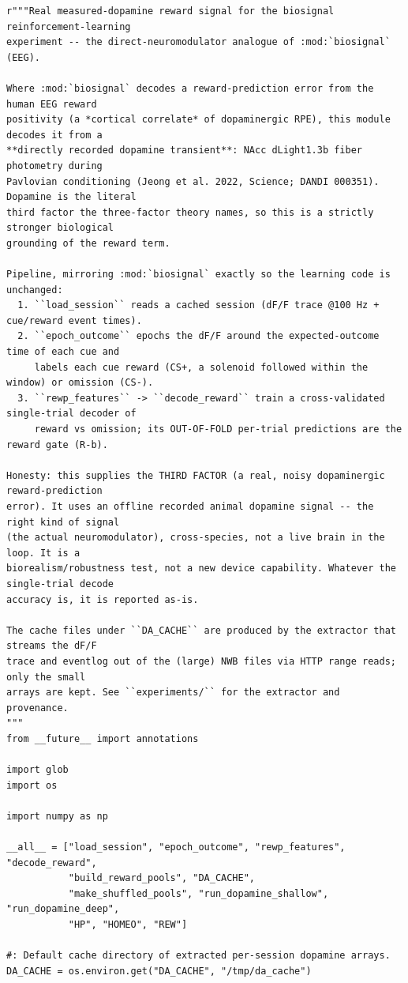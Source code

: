 \begin{lstlisting}[caption={mrl\_trace/dopamine.py},label={lst:siox-src-dopamine}]
r"""Real measured-dopamine reward signal for the biosignal reinforcement-learning
experiment -- the direct-neuromodulator analogue of :mod:`biosignal` (EEG).

Where :mod:`biosignal` decodes a reward-prediction error from the human EEG reward
positivity (a *cortical correlate* of dopaminergic RPE), this module decodes it from a
**directly recorded dopamine transient**: NAcc dLight1.3b fiber photometry during
Pavlovian conditioning (Jeong et al. 2022, Science; DANDI 000351). Dopamine is the literal
third factor the three-factor theory names, so this is a strictly stronger biological
grounding of the reward term.

Pipeline, mirroring :mod:`biosignal` exactly so the learning code is unchanged:
  1. ``load_session`` reads a cached session (dF/F trace @100 Hz + cue/reward event times).
  2. ``epoch_outcome`` epochs the dF/F around the expected-outcome time of each cue and
     labels each cue reward (CS+, a solenoid followed within the window) or omission (CS-).
  3. ``rewp_features`` -> ``decode_reward`` train a cross-validated single-trial decoder of
     reward vs omission; its OUT-OF-FOLD per-trial predictions are the reward gate (R-b).

Honesty: this supplies the THIRD FACTOR (a real, noisy dopaminergic reward-prediction
error). It uses an offline recorded animal dopamine signal -- the right kind of signal
(the actual neuromodulator), cross-species, not a live brain in the loop. It is a
biorealism/robustness test, not a new device capability. Whatever the single-trial decode
accuracy is, it is reported as-is.

The cache files under ``DA_CACHE`` are produced by the extractor that streams the dF/F
trace and eventlog out of the (large) NWB files via HTTP range reads; only the small
arrays are kept. See ``experiments/`` for the extractor and provenance.
"""
from __future__ import annotations

import glob
import os

import numpy as np

__all__ = ["load_session", "epoch_outcome", "rewp_features", "decode_reward",
           "build_reward_pools", "DA_CACHE",
           "make_shuffled_pools", "run_dopamine_shallow", "run_dopamine_deep",
           "HP", "HOMEO", "REW"]

#: Default cache directory of extracted per-session dopamine arrays.
DA_CACHE = os.environ.get("DA_CACHE", "/tmp/da_cache")


\end{lstlisting}
